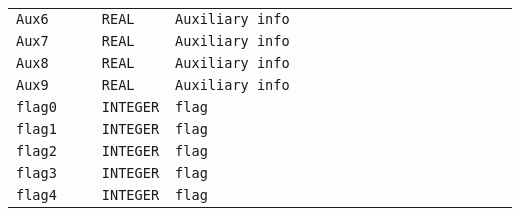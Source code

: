 \begin{minipage}{\linewidth}
\begin{tabular}{|l|l|l|l|}
\verb+Aux6        + & \verb+REAL   + & \verb"Auxiliary info                                                     "\\
\verb+Aux7        + & \verb+REAL   + & \verb"Auxiliary info                                                     "\\
\verb+Aux8        + & \verb+REAL   + & \verb"Auxiliary info                                                     "\\
\verb+Aux9        + & \verb+REAL   + & \verb"Auxiliary info                                                     "\\
\verb+flag0       + & \verb+INTEGER+ & \verb"flag                                                               "\\
\verb+flag1       + & \verb+INTEGER+ & \verb"flag                                                               "\\
\verb+flag2       + & \verb+INTEGER+ & \verb"flag                                                               "\\
\verb+flag3       + & \verb+INTEGER+ & \verb"flag                                                               "\\
\verb+flag4       + & \verb+INTEGER+ & \verb"flag                                                               "\\
\hline
\end{tabular}
\end{minipage}
\vskip 8mm
